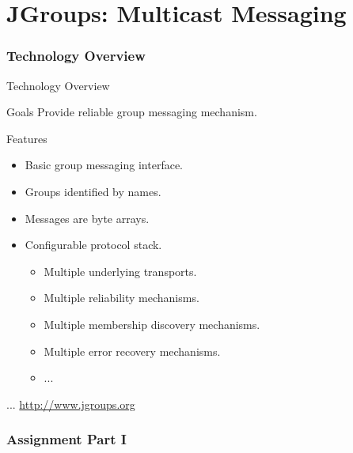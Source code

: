 \part{JGroups: Multicast Messaging}


\section{Technology Overview}


\begin{frame}{Technology Overview}
    \begin{block}{Goals}
        Provide reliable group messaging mechanism.
    \end{block}

    \bigskip

    \begin{block}{Features}
        \begin{itemize}
            \item Basic group messaging interface.
            \item Groups identified by names.
            \item Messages are byte arrays.
            \item Configurable protocol stack.
            \begin{itemize}
                \item Multiple underlying transports.
                \item Multiple reliability mechanisms.
                \item Multiple membership discovery mechanisms.
                \item Multiple error recovery mechanisms.
                \item ...
            \end{itemize}
        \end{itemize}
    \end{block}

    \bigskip

    \hfill ... \url{http://www.jgroups.org}
\end{frame}


\section{Assignment Part I}


